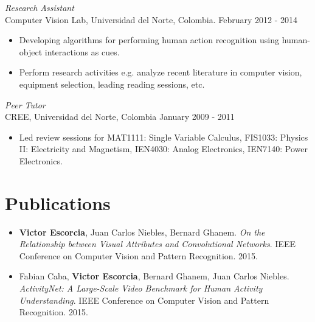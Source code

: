 \documentclass[margin]{res}
\begin{document}
\begin{resume}
 \textit{Research Assistant}\\
 Computer Vision Lab, Universidad del Norte, Colombia. \hfill February 2012 - 2014 \\
 \begin{itemize} \itemsep -2pt %
  \item Developing algorithms for performing human action recognition using
 human-object interactions as cues.
 \item Perform research activities e.g. analyze recent literature in computer
       vision, equipment selection, leading reading sessions, etc.
 \end{itemize}
 
 \textit{Peer Tutor}\\
 CREE, Universidad del Norte, Colombia \hfill January  2009 - 2011 \\
 \begin{itemize} \itemsep -2pt %
  \item Led review sessions for MAT1111: Single Variable Calculus, FIS1033:
 Physics II: Electricity and Magnetism, IEN4030: Analog Electronics,
 IEN7140: Power Electronics.
  \end{itemize}



\section{Publications} 
\begin{itemize} \itemsep -2pt %

\item \textbf{Victor Escorcia}, Juan Carlos Niebles, Bernard Ghanem.
\textit{On the Relationship between Visual Attributes and Convolutional
Networks}.
IEEE Conference on Computer Vision and Pattern Recognition. 2015.
\smallskip

\item Fabian Caba, \textbf{Victor Escorcia}, Bernard Ghanem, Juan Carlos
Niebles.
\textit{ActivityNet: A Large-Scale Video Benchmark for Human Activity
Understanding}.
IEEE Conference on Computer Vision and Pattern Recognition.
2015.
\smallskip


\end{itemize}
\end{resume}
\end{document}
